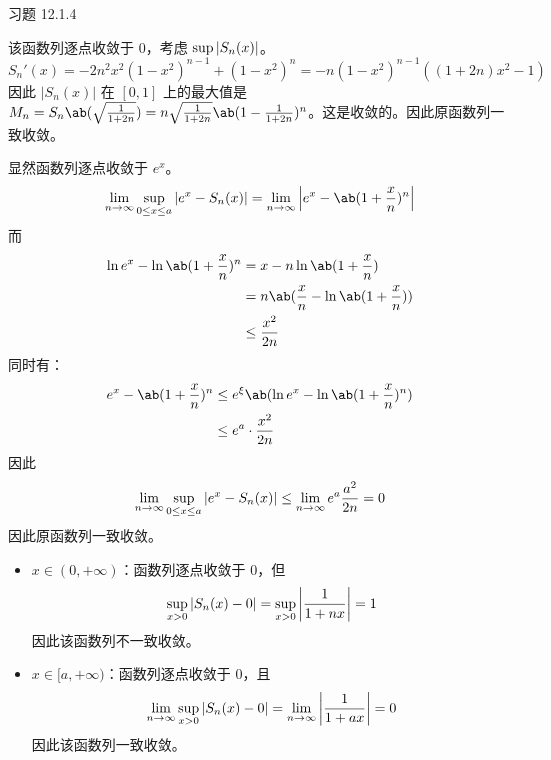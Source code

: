 \begin{problem}
    习题 12.1.4
    \begin{solution}
        \item[\textbf{2)}] 该函数列逐点收敛于 $0$，考虑 $\sup \abs{S_n(x)}$。
        $$
        S_n'(x) = -2n^2 x^2 (1 - x^2)^{n - 1} + (1 - x^2)^{n} = -n(1 - x^2)^{n - 1} ((1 + 2n) x^2 - 1)
        $$
        因此 $|S_n(x)|$ 在 $[0, 1]$ 上的最大值是 $M_n = S_n\ab(\sqrt{\frac{1}{1 + 2n}}) = n \sqrt{\frac{1}{1 + 2n}} \ab(1 - \frac{1}{1 + 2n})^{n}$。这是收敛的。因此原函数列一致收敛。

        \item[\textbf{4)}] 显然函数列逐点收敛于 $e^{x}$。
        $$
        \begin{aligned}
            \lim_{n \to \infty} \sup_{0 \le x \le a} \abs{e^{x} - S_n(x)} & = \lim_{n \to \infty} \abs{e^{x} - \ab(1 + \frac{x}{n})^{n}} \\
        \end{aligned}
        $$
        而
        $$
        \begin{aligned}
            \ln e^{x} - \ln \ab(1 + \frac{x}{n})^{n} & = x - n \ln \ab(1 + \frac{x}{n}) \\
            & = n \ab(\frac{x}{n} - \ln \ab(1 + \frac{x}{n})) \\
            & \le \frac{x^2}{2n}
        \end{aligned}
        $$
        同时有：
        $$
        \begin{aligned}
            e^{x} - \ab(1 + \frac{x}{n})^{n} & \le e^{\xi} \ab(\ln e^{x} - \ln \ab(1 + \frac{x}{n})^{n}) \\
            & \le e^{a} \cdot \frac{x^2}{2n}
        \end{aligned}
        $$
        因此
        $$
        \lim_{n \to \infty} \sup_{0 \le x \le a} \abs{e^{x} - S_n(x)} \le \lim_{n \to \infty} e^{a} \frac{a^2}{2n} = 0
        $$
        因此原函数列一致收敛。

        \item[\textbf{6)}]
        \begin{itemize}
            \item $x \in (0, +\infty)$：函数列逐点收敛于 $0$，但
            $$
            \sup_{x > 0} \abs{S_n(x) - 0} = \sup_{x > 0} \abs{\frac{1}{1 + n x}} = 1
            $$
            因此该函数列不一致收敛。

            \item $x \in [a, + \infty)$：函数列逐点收敛于 $0$，且
            $$
            \lim_{n \to \infty} \sup_{x > 0} \abs{S_n(x) - 0} = \lim_{n \to \infty} \abs{\frac{1}{1 + a x}} = 0
            $$
            因此该函数列一致收敛。
        \end{itemize}


\end{solution}
\end{problem}
